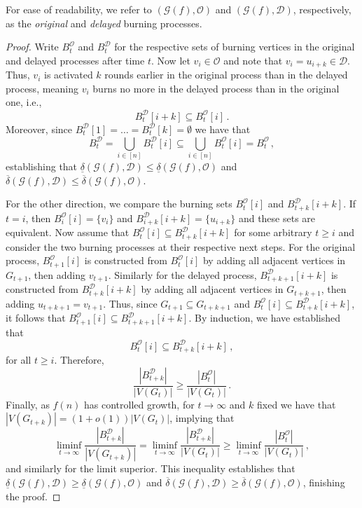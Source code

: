 \documentclass[12pt]{article}
\theoremstyle{remark}
\newcommand\cD{\mathcal D}
\newcommand\cG{\mathcal G}
\newcommand\cO{\mathcal O}
\newcommand{\ld}[2]{\ensuremath{\underline{\delta}\left(#1,#2\right)}}
\newcommand{\ud}[2]{\ensuremath{\overline{\delta}\left(#1,#2\right)}}
\begin{document}
For ease of readability, we refer to $(\cG(f), \cO)$ and $(\cG(f), \cD)$, respectively, as the \emph{original} and \emph{delayed} burning processes.  

\begin{proof}
Write $B^{\cO}_t$ and $B^{\cD}_t$ for the respective sets of burning vertices in the original and delayed processes after time $t$. Now let $v_i \in \cO$ and note that $v_i = u_{i+k} \in \cD$. Thus, $v_i$ is activated $k$ rounds earlier in the original process than in the delayed process, meaning $v_i$ burns no more in the delayed process than in the original one, i.e., 
\[
B^{\cD}_t[i+k] \subseteq B^{\cO}_t[i] \,.
\]
Moreover, since $B^{\cD}_t[1] = \dots = B^{\cD}_t[k] = \emptyset$ we have that
\[
B^{\cD}_t
= 
\bigcup_{i \in [n]} B^{\cD}_t[i]
\subseteq 
\bigcup_{i \in [n]} B^{\cO}_t[i]
= 
B^{\cO}_t\,,
\]
establishing that $\ld{\cG(f)}{\cD} \leq \ld{\cG(f)}{\cO}$ and $\ud{\cG(f)}{\cD} \leq \ud{\cG(f)}{\cO}$.

For the other direction, we compare the burning sets $B^{\cO}_t[i]$ and $B^{\cD}_{t+k}[i+k]$. If $t=i$, then $B^{\cO}_i[i] = \{v_i\}$ and $B^{\cD}_{i+k}[i+k] = \{u_{i+k}\}$ and these sets are equivalent. Now assume that $B^{\cO}_t[i] \subseteq B^{\cD}_{t+k}[i+k]$ for some arbitrary $t \geq i$ and consider the two burning processes at their respective next steps. For the original process, $B^{\cO}_{t+1}[i]$ is constructed from $B^{\cO}_t[i]$ by adding all adjacent vertices in $G_{t+1}$, then adding $v_{t+1}$. Similarly for the delayed process, $B^{\cD}_{t+k+1}[i+k]$ is constructed from $B^{\cD}_{t+k}[i+k]$ by adding all adjacent vertices in $G_{t+k+1}$, then adding $u_{t+k+1} = v_{t+1}$. Thus, since $G_{t+1} \subseteq G_{t+k+1}$ and $B^{\cO}_t[i] \subseteq B^{\cD}_{t+k}[i+k]$, it follows that $B^{\cO}_{t+1}[i] \subseteq B^{\cD}_{t+k+1}[i+k]$. By induction, we have established that 
\[
B^{\cO}_t[i] \subseteq B^{\cD}_{t+k}[i+k]  \,,
\]
for all $t \geq i$. Therefore,
\[
\frac{|B^{\cD}_{t+k}|}{|V(G_t)|} \geq \frac{|B^{\cO}_{t}|}{|V(G_t)|} \,.
\]
Finally, as $f(n)$ has controlled growth, for $t \to \infty$ and $k$ fixed we have that $|V(G_{t+k})| = (1+o(1))|V(G_{t})|$, implying that 
\[
\liminf_{t \to \infty} \frac{|B^{\cD}_{t+k}|}{|V(G_{t+k})|}
=
\liminf_{t \to \infty} \frac{|B^{\cD}_{t+k}|}{|V(G_{t})|}
\geq 
\liminf_{t \to \infty} \frac{|B^{\cO}_{t}|}{|V(G_t)|} \,,
\]
and similarly for the limit superior. This inequality establishes that $\ld{\cG(f)}{\cD} \geq \ld{\cG(f)}{\cO}$ and $\ud{\cG(f)}{\cD} \geq \ud{\cG(f)}{\cO}$, finishing the proof.
\end{proof}
\end{document}
